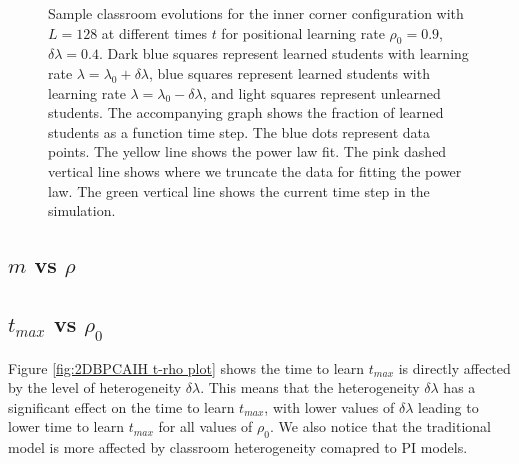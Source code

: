 \begin{figure}[htbp!]
   \caption{Sample classroom evolutions for the inner corner configuration with $L=128$ at different times $t$ for positional learning rate $\rho_0=0.9$, $\delta\lambda = 0.4$.
   Dark blue squares represent learned students with learning rate $\lambda = \lambda_0 + \delta\lambda$, blue squares represent learned students with learning rate $\lambda = \lambda_0 - \delta\lambda$, and light squares represent unlearned students.
   The accompanying graph shows the fraction of learned students as a function time step.
   The blue dots represent data points. 
   The yellow line shows the power law fit.
   The pink dashed vertical line shows where we truncate the data for fitting the power law.
   The green vertical line shows the current time step in the simulation.
    }
    \label{fig:2DBPCAIH sample class evolution trad low rho high delta}
 \end{figure}

\newpage %

\subsection{$m$ vs $\rho$}\label{subsec:BPCAIH m vs rho}

\subsection{$t_{max}$ vs $\rho_0$}\label{subsec:BPCAIH t vs rho}
Figure \ref{fig:2DBPCAIH t-rho plot} shows the time to learn $t_{max}$ is directly affected by the level of heterogeneity $\delta\lambda$. 
This means that the heterogeneity $\delta\lambda$ has a significant effect on the time to learn $t_{max}$, with lower values of $\delta\lambda$ leading to lower time to learn $t_{max}$ for all values of $\rho_0$. 
We also notice that the traditional model is more affected by classroom heterogeneity comapred to PI models.

